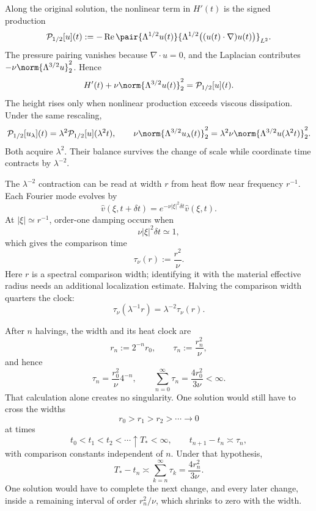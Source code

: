 Along the original solution, the nonlinear term in \(H'(t)\) is the signed production
\[
  \mathcal P_{1/2}[u](t)
  :=
  -\operatorname{Re}
  \pair
    {\Lambda^{1/2}u(t)}
    {\Lambda^{1/2}\bigl((u(t)\cdot\nabla)u(t)\bigr)}_{L^2}.
\]
The pressure pairing vanishes because \(\nabla\cdot u=0\), and the Laplacian contributes \(-\nu\norm{\Lambda^{3/2}u}_2^2\). Hence
\[
  H'(t)
  +
  \nu\norm{\Lambda^{3/2}u(t)}_2^2
  =
  \mathcal P_{1/2}[u](t).
\]
The height rises only when nonlinear production exceeds viscous dissipation. Under the same rescaling,
\[
  \mathcal P_{1/2}[u_\lambda](t)
  =
  \lambda^2\mathcal P_{1/2}[u](\lambda^2t),
  \qquad
  \nu\norm{\Lambda^{3/2}u_\lambda(t)}_2^2
  =
  \lambda^2\nu\norm{\Lambda^{3/2}u(\lambda^2t)}_2^2.
\]
Both acquire \(\lambda^2\). Their balance survives the change of scale while coordinate time contracts by \(\lambda^{-2}\).


The \(\lambda^{-2}\) contraction can be read at width \(r\) from heat flow near frequency \(r^{-1}\). Each Fourier mode evolves by
\[
  \widehat v(\xi,t+\delta t)
  =
  e^{-\nu|\xi|^2\delta t}\widehat v(\xi,t).
\]
At \(|\xi|\simeq r^{-1}\), order-one damping occurs when
\[
  \nu|\xi|^2\delta t\simeq1,
\]
which gives the comparison time
\[
  \tau_\nu(r)
  :=
  \frac{r^2}{\nu}.
\]
Here \(r\) is a spectral comparison width; identifying it with the material effective radius needs an additional localization estimate. Halving the comparison width quarters the clock:
\[
  \tau_\nu(\lambda^{-1}r)
  =
  \lambda^{-2}\tau_\nu(r).
\]


After \(n\) halvings, the width and its heat clock are
\[
  r_n:=2^{-n}r_0,
  \qquad
  \tau_n:=\frac{r_n^2}{\nu},
\]
and hence
\[
  \tau_n
  =
  \frac{r_0^2}{\nu}4^{-n},
  \qquad
  \sum_{n=0}^{\infty}\tau_n
  =
  \frac{4r_0^2}{3\nu}
  <
  \infty.
\]
That calculation alone creates no singularity. One \NavierStokes{} solution would still have to cross the widths
\[
  r_0>r_1>r_2>\cdots\longrightarrow0
\]
at times
\[
  t_0<t_1<t_2<\cdots\uparrow T_*<\infty,
  \qquad
  t_{n+1}-t_n\asymp\tau_n,
\]
with comparison constants independent of \(n\). Under that hypothesis,
\[
  T_*-t_n
  \asymp
  \sum_{k=n}^{\infty}\tau_k
  =
  \frac{4r_n^2}{3\nu}.
\]
One solution would have to complete the next change, and every later change, inside a remaining interval of order \(r_n^2/\nu\), which shrinks to zero with the width.
